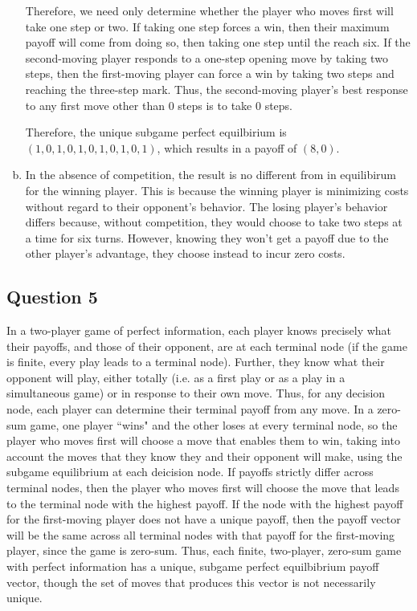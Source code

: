 \documentclass{article}
\begin{document}
\begin{enumerate}[(a)]
	Therefore, we need only determine whether the player who moves first will take one step or two. If taking one step forces a win, then their maximum payoff will come from doing so, then taking one step until the reach six. If the second-moving player responds to a one-step opening move by taking two steps, then the first-moving player can force a win by taking two steps and reaching the three-step mark. Thus, the second-moving player's best response to any first move other than 0 steps is to take 0 steps.
	
	Therefore, the unique subgame perfect equilbirium is $(1,0,1,0,1,0,1,0,1,0,1)$, which results in a payoff of $(8,0)$.
	
	\item In the absence of competition, the result is no different from in equilibirum for the winning player. This is because the winning player is minimizing costs without regard to their opponent's behavior. The losing player's behavior differs because, without competition, they would choose to take two steps at a time for six turns. However, knowing they won't get a payoff due to the other player's advantage, they choose instead to incur zero costs.
	
\end{enumerate}


\subsection*{Question 5}
In a two-player game of perfect information, each player knows precisely what their payoffs, and those of their opponent, are at each terminal node (if the game is finite, every play leads to a terminal node). Further, they know what their opponent will play, either totally (i.e. as a first play or as a play in a simultaneous game) or in response to their own move. Thus, for any decision node, each player can determine their terminal payoff from any move. In a zero-sum game, one player ``wins" and the other loses at every terminal node, so the player who moves first will choose a move that enables them to win, taking into account the moves that they know they and their opponent will make, using the subgame equilibrium at each deicision node. If payoffs strictly differ across terminal nodes, then the player who moves first will choose the move that leads to the terminal node with the highest payoff. If the node with the highest payoff for the first-moving player does not have a unique payoff, then the payoff vector will be the same across all terminal nodes with that payoff for the first-moving player, since the game is zero-sum. Thus, each finite, two-player, zero-sum game with perfect information has a unique, subgame perfect equilbibrium payoff vector, though the set of moves that produces this vector is not necessarily unique.
\end{document}
